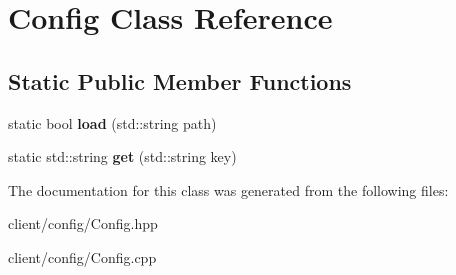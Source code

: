 \hypertarget{class_config}{\section{Config Class Reference}
\label{class_config}
}
\subsection*{Static Public Member Functions}
\begin{DoxyCompactItemize}
\item 
\hypertarget{class_config_a282cfecfe72df1c6a0a7b68667b8bbc7}{static bool {\bfseries load} (std\-::string path)}\label{class_config_a282cfecfe72df1c6a0a7b68667b8bbc7}

\item 
\hypertarget{class_config_a3c55d333e4f503cf0de93e6e4e229592}{static std\-::string {\bfseries get} (std\-::string key)}\label{class_config_a3c55d333e4f503cf0de93e6e4e229592}

\end{DoxyCompactItemize}


The documentation for this class was generated from the following files\-:\begin{DoxyCompactItemize}
\item 
client/config/Config.\-hpp\item 
client/config/Config.\-cpp\end{DoxyCompactItemize}
